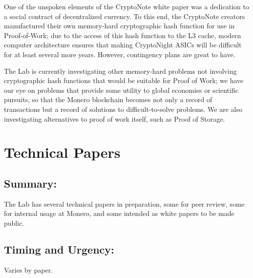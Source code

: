 \documentclass[12pt,english]{mrl}
\theoremstyle{definition}
\numberwithin{equation}{section}
\numberwithin{figure}{section}
\numberwithin{equation}{section}
\numberwithin{equation}{section}
\numberwithin{figure}{section}
\begin{document}
One of the unspoken elements of the CryptoNote white paper was a dedication to a social contract of decentralized currency. To this end, the CryptoNote creators manufactured their own memory-hard cryptographic hash function for use in Proof-of-Work; due to the access of this hash function to the L3 cache, modern computer architecture ensures that making CryptoNight ASICs will be difficult for at least several more years. However, contingency plans are great to have.

The Lab is currently investigating other memory-hard problems not involving cryptographic hash functions that would be suitable for Proof of Work; we have our eye on problems that provide some utility to global economies or scientific pursuits, so that the Monero blockchain becomes not only a record of transactions but a record of solutions to difficult-to-solve problems. We are also investigating alternatives to proof of work itself, such as Proof of Storage.




\section{Technical Papers}

\subsection{Summary:}

The Lab has several technical papers in preparation, some for peer review, some for internal usage at Monero, and some intended as white papers to be made public.

\subsection{Timing and Urgency:}

Varies by paper.
\end{document}
